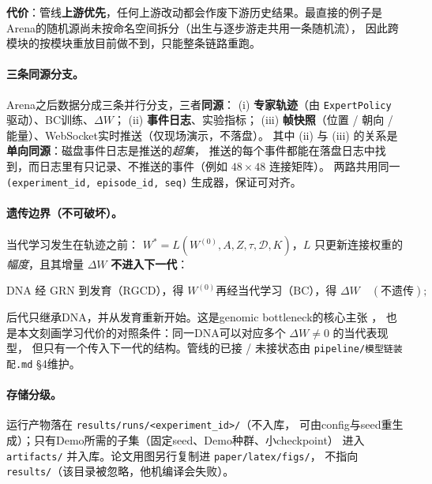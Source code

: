 \textbf{代价}：管线\textbf{上游优先}，任何上游改动都会作废下游历史结果。最直接的例子是
Arena的随机源尚未按命名空间拆分（出生与逐步游走共用一条随机流），
因此跨模块的按模块重放目前做不到，只能整条链路重跑。

\paragraph{三条同源分支。}Arena之后数据分成三条并行分支，三者\textbf{同源}：
(i) \textbf{专家轨迹}（由 \texttt{ExpertPolicy} 驱动）、BC训练、$\Delta W$；
(ii) \textbf{事件日志}、实验指标；
(iii) \textbf{帧快照}（位置 / 朝向 / 能量）、WebSocket实时推送（仅现场演示，不落盘）。
其中 (ii) 与 (iii) 的关系是\textbf{单向同源}：磁盘事件日志是推送的\emph{超集}，
推送的每个事件都能在落盘日志中找到，而日志里有只记录、不推送的事件（例如 $48\times48$ 连接矩阵）。
两路共用同一 \texttt{(experiment\_id, episode\_id, seq)} 生成器，保证可对齐。

\paragraph{遗传边界（不可破坏）。}当代学习发生在轨迹之前：
$W^{*}=L(W^{(0)},A,Z,\tau,\mathcal{D},K)$，$L$ 只更新连接权重的\emph{幅度}，且其增量 $\Delta W$
\textbf{不进入下一代}：

\begin{equation}\label{method:eq-boundary}
\text{DNA 经 GRN 到发育（RGCD），得 } W^{(0)}
\text{再经当代学习（BC），得 } \Delta W \quad(\text{不遗传});
\end{equation}

后代只继承DNA，并从发育重新开始。这是genomic bottleneck的核心主张
\citep{bib1_zador2019,bib2_barabasi2023,bib3_shuvaev2024}，
也是本文刻画学习代价的对照条件：同一DNA可以对应多个 $\Delta W \neq 0$ 的当代表现型，
但只有一个传入下一代的结构。管线的已接 / 未接状态由
\texttt{pipeline/模型链装配.md} §4维护。

\paragraph{存储分级。}运行产物落在 \texttt{results/runs/<experiment\_id>/}（不入库，
可由config与seed重生成）；只有Demo所需的子集（固定seed、Demo种群、小checkpoint）
进入 \texttt{artifacts/} 并入库。论文用图另行复制进 \texttt{paper/latex/figs/}，
不指向 \texttt{results/}（该目录被忽略，他机编译会失败）。


